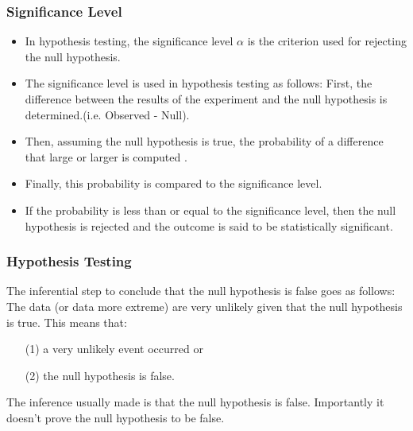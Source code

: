 ﻿\documentclass[a4]{beamer}
\begin{document}


\begin{frame}
\frametitle{Significance Level}

\begin{itemize}
\item In hypothesis testing, the significance level $\alpha$ is the criterion used for rejecting the null hypothesis. \item The significance level is used in hypothesis testing as follows: First, the difference between the results of the experiment and the null hypothesis is determined.(i.e. Observed - Null). \item Then, assuming the null hypothesis is true, the probability of a difference that large or larger is computed . \item Finally, this probability is compared to the significance level.\item  If the probability is less than or equal to the significance level, then the null hypothesis is rejected and the outcome is said to be statistically significant.
\end{itemize}
\end{frame}

\begin{frame}
\frametitle{Hypothesis Testing}
The inferential step to conclude that the null hypothesis is false goes as follows: The data (or data more extreme) are very unlikely given that the null hypothesis is true.
\bigskip
This means that:
\begin{itemize}
\item[(1)] a very unlikely event occurred or
\item[(2)] the null hypothesis is false.
\end{itemize}
\bigskip
The inference usually made is that the null hypothesis is false. Importantly it doesn't prove the null hypothesis to be false.
\end{frame}
\end{document}
